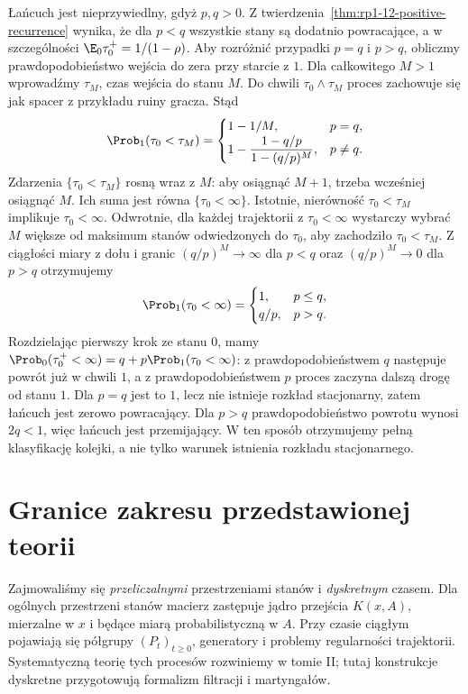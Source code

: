 \begin{przyklad}
Łańcuch jest nieprzywiedlny, gdyż $p,q>0$.
Z twierdzenia~\ref{thm:rp1-12-positive-recurrence}
wynika, że dla $p<q$ wszystkie stany są dodatnio
powracające, a w szczególności
$\E_0\tau_0^+=1/(1-\rho)$.
Aby rozróżnić przypadki $p=q$ i $p>q$,
obliczmy prawdopodobieństwo wejścia do zera
przy starcie z $1$. Dla całkowitego $M>1$
wprowadźmy $\tau_M$, czas wejścia do stanu $M$.
Do chwili $\tau_0\wedge\tau_M$ proces zachowuje
się jak spacer z przykładu ruiny gracza.
Stąd
\[
\Prob_1(\tau_0<\tau_M)=
\begin{cases}
1-1/M,&p=q,\\
1-\dfrac{1-q/p}{1-(q/p)^M},&p\ne q.
\end{cases}
\]
Zdarzenia $\{\tau_0<\tau_M\}$ rosną wraz z $M$:
aby osiągnąć $M+1$, trzeba wcześniej osiągnąć $M$.
Ich suma jest równa $\{\tau_0<\infty\}$.
Istotnie, nierówność $\tau_0<\tau_M$ implikuje
$\tau_0<\infty$. Odwrotnie, dla każdej trajektorii
z $\tau_0<\infty$ wystarczy wybrać $M$ większe
od maksimum stanów odwiedzonych do $\tau_0$,
aby zachodziło $\tau_0<\tau_M$. Z ciągłości miary z dołu i granic
$(q/p)^M\to\infty$ dla $p<q$ oraz
$(q/p)^M\to0$ dla $p>q$ otrzymujemy
\[
\Prob_1(\tau_0<\infty)=
\begin{cases}
1,&p\leq q,\\
q/p,&p>q.
\end{cases}
\]
Rozdzielając pierwszy krok ze stanu $0$, mamy
$\Prob_0(\tau_0^+<\infty)=q+p\Prob_1(\tau_0<\infty)$:
z prawdopodobieństwem $q$ następuje powrót już
w chwili $1$, a z prawdopodobieństwem $p$
proces zaczyna dalszą drogę od stanu $1$.
Dla $p=q$ jest to $1$, lecz nie istnieje
rozkład stacjonarny, zatem łańcuch jest zerowo
powracający. Dla $p>q$ prawdopodobieństwo
powrotu wynosi $2q<1$, więc łańcuch jest
przemijający. W ten sposób otrzymujemy pełną
klasyfikację kolejki, a nie tylko warunek istnienia
rozkładu stacjonarnego.
\end{przyklad}


\section{Granice zakresu przedstawionej teorii}

Zajmowaliśmy się \emph{przeliczalnymi} przestrzeniami
stanów i \emph{dyskretnym} czasem. Dla ogólnych
przestrzeni stanów macierz zastępuje jądro
przejścia $K(x,A)$, mierzalne w $x$ i będące
miarą probabilistyczną w $A$. Przy czasie ciągłym
pojawiają się półgrupy $(P_t)_{t\geq0}$,
generatory i problemy regularności trajektorii.
Systematyczną teorię tych procesów rozwiniemy
w tomie II; tutaj konstrukcje dyskretne
przygotowują formalizm filtracji i martyngałów.


